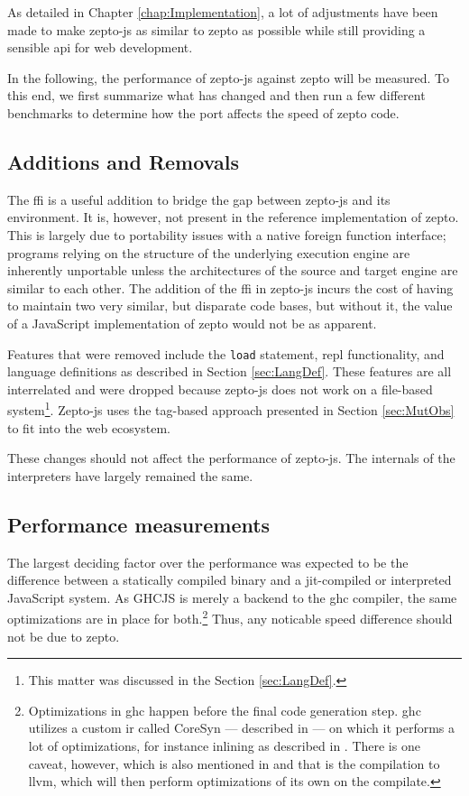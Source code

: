 \documentclass[oneside,11pt,xetex]{scrbook}
\begin{document}
As detailed in Chapter \ref{chap:Implementation}, a lot of adjustments have been made
to make zepto-js as similar to zepto as possible while still providing a sensible \gls{api}
for web development.

In the following, the performance of zepto-js against zepto will be measured.
To this end, we first summarize what has changed and then run a few different
benchmarks to determine how the port affects the speed of zepto code.

\subsection{Additions and Removals}

The \gls{ffi} is a useful addition to bridge the gap between zepto-js and its
environment. It is, however, not present in the reference implementation of zepto.
This is largely due to portability issues with a native foreign function interface;
programs relying on the structure of the underlying execution engine are inherently
unportable unless the architectures of the source and target engine are similar to
each other. The addition of the \gls{ffi} in zepto-js incurs the cost of having to
maintain two very similar, but disparate code bases, but without it, the value of
a JavaScript implementation of zepto would not be as apparent.

Features that were removed include the \texttt{load} statement, \gls{repl} functionality,
and language definitions as described in Section \ref{sec:LangDef}. These features
are all interrelated and were dropped because zepto-js does not work on a file-based
system\footnote{This matter was discussed in the Section \ref{sec:LangDef}.}. Zepto-js
uses the tag-based approach presented in Section \ref{sec:MutObs} to fit into the web
ecosystem.

These changes should not affect the performance of zepto-js. The internals of the
interpreters have largely remained the same.

\subsection{Performance measurements}

The largest deciding factor over the performance was expected to be the difference
between a statically compiled binary and a \gls{jit}-compiled or interpreted
JavaScript system. As GHCJS is merely a backend to the \gls{ghc} compiler, the
same optimizations are in place for both.\footnote{Optimizations in \gls{ghc} happen
before the final code generation step. \gls{ghc} utilizes a custom \gls{ir} called
CoreSyn --- described in \cite{CORE} --- on which it performs a lot of optimizations,
for instance inlining as described in \cite{SECR}. There is one caveat, however, which
is also mentioned in \cite{CORE} and that is the compilation to \gls{llvm}, which will
then perform optimizations of its own on the compilate.} Thus, any noticable speed difference
should not be due to zepto.
\end{document}
